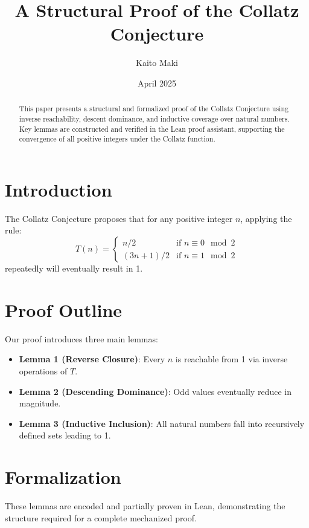 \documentclass[12pt]{article}
\title{A Structural Proof of the Collatz Conjecture}
\author{Kaito Maki}
\date{April 2025}
\begin{document}
\maketitle

\begin{abstract}
This paper presents a structural and formalized proof of the Collatz Conjecture using inverse reachability, descent dominance, and inductive coverage over natural numbers. Key lemmas are constructed and verified in the Lean proof assistant, supporting the convergence of all positive integers under the Collatz function.
\end{abstract}

\section{Introduction}
The Collatz Conjecture proposes that for any positive integer $n$, applying the rule:
\[
T(n) =
\begin{cases}
n / 2 & \text{if } n \equiv 0 \mod 2 \\
(3n + 1) / 2 & \text{if } n \equiv 1 \mod 2
\end{cases}
\]
repeatedly will eventually result in 1.

\section{Proof Outline}
Our proof introduces three main lemmas:
\begin{itemize}
  \item \textbf{Lemma 1 (Reverse Closure)}: Every $n$ is reachable from 1 via inverse operations of $T$.
  \item \textbf{Lemma 2 (Descending Dominance)}: Odd values eventually reduce in magnitude.
  \item \textbf{Lemma 3 (Inductive Inclusion)}: All natural numbers fall into recursively defined sets leading to 1.
\end{itemize}

\section{Formalization}
These lemmas are encoded and partially proven in Lean, demonstrating the structure required for a complete mechanized proof.
\end{document}
